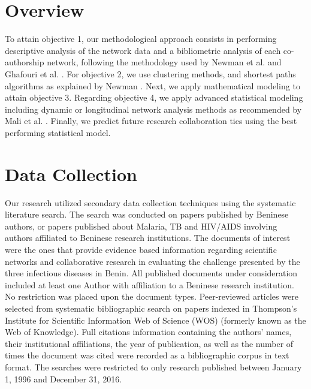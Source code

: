 


\section{Overview}
To attain objective 1, our methodological approach consists in performing descriptive analysis of the network data and a bibliometric analysis of each co-authorship network, following the methodology used by Newman et al. \cite{newman_structure_2001} and Ghafouri et al. \cite{ghafouri_social_2014}. For objective 2, we use clustering methods, and shortest paths algorithms as explained by Newman \cite{newman_scientific_2001,newman_scientific_2001-1}. Next, we apply mathematical modeling to attain objective 3. Regarding objective 4, we apply advanced statistical modeling including dynamic or longitudinal network analysis methods as recommended by Mali et al. \cite{mali_dynamic_2012}. Finally, we predict future research collaboration ties using the best performing statistical model.%

\section{Data Collection}
\label{sec:data_collection}
Our research utilized secondary data collection techniques using the systematic literature search. The search was conducted on papers published by Beninese authors, or papers published about Malaria, TB and HIV/AIDS involving authors affiliated to Beninese research institutions. The documents of interest were the ones that provide evidence based information regarding scientific networks and collaborative research in evaluating the challenge presented by the three infectious diseases in Benin. All published documents under consideration included at least one Author with affiliation to a Beninese research institution. No restriction was placed upon the document types. Peer-reviewed articles were selected from systematic bibliographic search on papers indexed in Thompson's Institute for Scientific Information Web of Science (WOS) (formerly known as the Web of Knowledge). Full citations information containing the authors’ names, their institutional affiliations, the year of publication, as well as the number of times the document was cited were recorded as a bibliographic corpus in text format. The searches were restricted to only research published between January 1, 1996 and December 31, 2016. 

